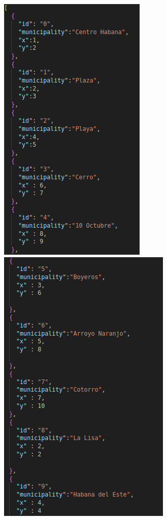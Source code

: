 \documentclass{article}
\begin{document}
\includegraphics{m1.png}
\newline
\includegraphics{m2.png}
\newline
\end{document}

